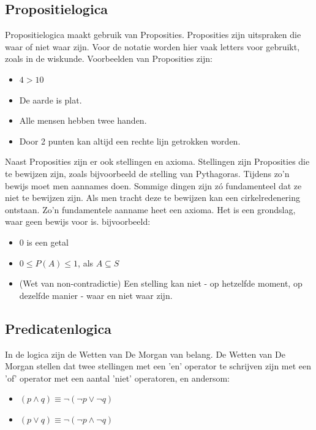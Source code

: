 \documentclass{article}
\begin{document}
		\subsection{Propositielogica}
		
		Propositielogica maakt gebruik van Proposities. Proposities zijn uitspraken die waar of niet waar zijn. Voor de notatie worden hier vaak letters voor gebruikt, zoals in de wiskunde. Voorbeelden van Proposities zijn:

		\begin{itemize}
			\item \( 4 > 10 \)
			\item De aarde is plat.
			\item Alle mensen hebben twee handen.
			\item Door 2 punten kan altijd een rechte lijn getrokken worden.
		\end{itemize}

		Naast Proposities zijn er ook stellingen en axioma. Stellingen zijn Proposities die te bewijzen zijn, zoals bijvoorbeeld de stelling van Pythagoras. Tijdens zo'n bewijs moet men aannames doen. Sommige dingen zijn zó fundamenteel dat ze niet te bewijzen zijn. Als men tracht deze te bewijzen kan een cirkelredenering ontstaan. Zo'n fundamentele aanname heet een axioma. Het is een grondslag, waar geen bewijs voor is. bijvoorbeeld:

		\begin{itemize}
			\item 0 is een getal
			\item \( 0 \leq P(A) \leq 1 \), als \( A \subseteq S \)
			\item (Wet van non-contradictie) Een stelling kan niet - op hetzelfde moment, op dezelfde manier - waar en niet waar zijn.
		\end{itemize}
		
		\subsection{Predicatenlogica}
		
		In de logica zijn de Wetten van De Morgan van belang. De Wetten van De Morgan stellen dat twee stellingen met een 'en' operator te schrijven zijn met een 'of' operator met een aantal 'niet' operatoren, en andersom:
	
		\begin{itemize}
			\item \( (p \land q) \equiv \neg(\neg p \lor \neg q) \)
			\item \( (p \lor q) \equiv \neg(\neg p \land \neg q) \)
		\end{itemize}
		
\end{document}

